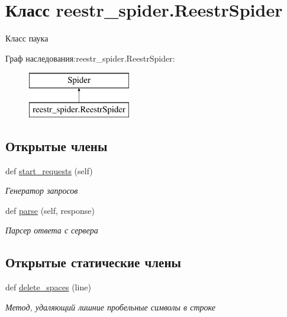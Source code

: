\hypertarget{classreestr__spider_1_1ReestrSpider}{}\section{Класс reestr\+\_\+spider.\+Reestr\+Spider}
\label{classreestr__spider_1_1ReestrSpider}


Класс паука  


Граф наследования\+:reestr\+\_\+spider.\+Reestr\+Spider\+:\begin{figure}[H]
\begin{center}
\leavevmode
\includegraphics[height=2.000000cm]{classreestr__spider_1_1ReestrSpider}
\end{center}
\end{figure}
\subsection*{Открытые члены}
\begin{DoxyCompactItemize}
\item 
def \hyperlink{classreestr__spider_1_1ReestrSpider_aefeae36f75466e6df09087955be618ff}{start\+\_\+requests} (self)
\begin{DoxyCompactList}\small\item\em Генератор запросов \end{DoxyCompactList}\item 
def \hyperlink{classreestr__spider_1_1ReestrSpider_a1995683a0087b22c906ea7806c1cb3d7}{parse} (self, response)
\begin{DoxyCompactList}\small\item\em Парсер ответа с сервера \end{DoxyCompactList}\end{DoxyCompactItemize}
\subsection*{Открытые статические члены}
\begin{DoxyCompactItemize}
\item 
def \hyperlink{classreestr__spider_1_1ReestrSpider_ac04a7814ce5c2beb13a2ad733cfd49ff}{delete\+\_\+spaces} (line)
\begin{DoxyCompactList}\small\item\em Метод, удаляющий лишние пробельные символы в строке \end{DoxyCompactList}\end{DoxyCompactItemize}
